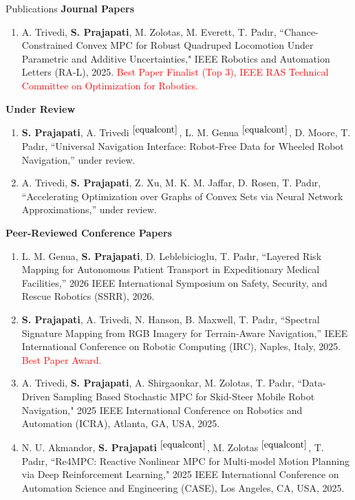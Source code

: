 \documentclass{resume}
\begin{document}
\vspace{-3mm}
\begin{rSection}{Publications}
\textbf{Journal Papers}
\vspace{-1mm}
\begin{enumerate}[leftmargin=0.5cm]
  \item A. Trivedi, \textbf{S. Prajapati}, M. Zolotas, M. Everett, T. Pad{\i}r, ``Chance-Constrained Convex MPC for Robust Quadruped Locomotion Under Parametric and Additive Uncertainties," IEEE Robotics and Automation Letters (RA-L), 2025. \textcolor{red}{Best Paper Finalist (Top 3), IEEE RAS Technical Committee on Optimization for Robotics.}
\end{enumerate}
\textbf{Under Review}
\vspace{-1mm}
\begin{enumerate}[leftmargin=0.5cm]
  \item \textbf{S. Prajapati}, A. Trivedi$^{~\ref{equalcont}}$, L. M. Genua$^{~\ref{equalcont}}$, D. Moore, T. Pad{\i}r, ``Universal Navigation Interface: Robot-Free Data for Wheeled Robot Navigation,'' under review.
  \item A. Trivedi, \textbf{S. Prajapati}, Z. Xu, M. K. M. Jaffar, D. Rosen, T. Pad{\i}r, ``Accelerating Optimization over Graphs of Convex Sets via Neural Network Approximations,'' under review.
\end{enumerate}
\textbf{Peer-Reviewed Conference Papers}
\vspace{-1mm}
\begin{enumerate}[leftmargin=0.5cm]
    \item L. M. Genua, \textbf{S. Prajapati}, D. Leblebicioglu, T. Pad{\i}r, ``Layered Risk Mapping for Autonomous Patient Transport in Expeditionary Medical Facilities,'' 2026 IEEE International Symposium on Safety, Security, and Rescue Robotics (SSRR), 2026.
    \item \textbf{S. Prajapati}, A. Trivedi, N. Hanson, B. Maxwell, T. Pad{\i}r, ``Spectral Signature Mapping from RGB Imagery for Terrain-Aware Navigation,'' IEEE International Conference on Robotic Computing (IRC), Naples, Italy, 2025. \textcolor{red}{Best Paper Award.}
     \item A. Trivedi, \textbf{S. Prajapati}, A. Shirgaonkar, M. Zolotas, T. Pad{\i}r, ``Data-Driven Sampling Based Stochastic MPC for Skid-Steer Mobile
Robot Navigation," 2025 IEEE International Conference on Robotics and Automation (ICRA), Atlanta, GA, USA, 2025.
    \item N. U. Akmandor, \textbf{S. Prajapati$^{~\ref{equalcont}}$}, M. Zolotas$^{~\ref{equalcont}}$, T. Pad{\i}r, ``Re4MPC: Reactive Nonlinear MPC for Multi-model Motion Planning via Deep Reinforcement Learning," 2025 IEEE International Conference on Automation Science and Engineering (CASE), Los Angeles, CA, USA, 2025.


\end{enumerate}
\end{rSection}
\end{document}
